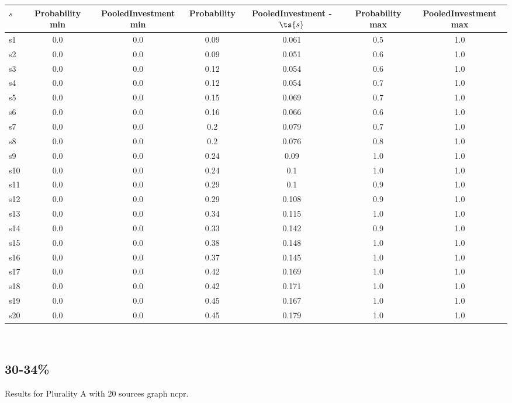 \documentclass{article}
\begin{document}
\noindent\begin{tabular}{|l|c|c|c|c|c|c|}
\hline
$s$& Probability min & PooledInvestment min & Probability & PooledInvestment - $\ts{s}$ & Probability max & PooledInvestment max\\
\hline
s1 &0.0 & 0.0 & 0.09 & 0.061 & 0.5 & 1.0\\
\hline
s2 &0.0 & 0.0 & 0.09 & 0.051 & 0.6 & 1.0\\
\hline
s3 &0.0 & 0.0 & 0.12 & 0.054 & 0.6 & 1.0\\
\hline
s4 &0.0 & 0.0 & 0.12 & 0.054 & 0.7 & 1.0\\
\hline
s5 &0.0 & 0.0 & 0.15 & 0.069 & 0.7 & 1.0\\
\hline
s6 &0.0 & 0.0 & 0.16 & 0.066 & 0.6 & 1.0\\
\hline
s7 &0.0 & 0.0 & 0.2 & 0.079 & 0.7 & 1.0\\
\hline
s8 &0.0 & 0.0 & 0.2 & 0.076 & 0.8 & 1.0\\
\hline
s9 &0.0 & 0.0 & 0.24 & 0.09 & 1.0 & 1.0\\
\hline
s10 &0.0 & 0.0 & 0.24 & 0.1 & 1.0 & 1.0\\
\hline
s11 &0.0 & 0.0 & 0.29 & 0.1 & 0.9 & 1.0\\
\hline
s12 &0.0 & 0.0 & 0.29 & 0.108 & 0.9 & 1.0\\
\hline
s13 &0.0 & 0.0 & 0.34 & 0.115 & 1.0 & 1.0\\
\hline
s14 &0.0 & 0.0 & 0.33 & 0.142 & 0.9 & 1.0\\
\hline
s15 &0.0 & 0.0 & 0.38 & 0.148 & 1.0 & 1.0\\
\hline
s16 &0.0 & 0.0 & 0.37 & 0.145 & 1.0 & 1.0\\
\hline
s17 &0.0 & 0.0 & 0.42 & 0.169 & 1.0 & 1.0\\
\hline
s18 &0.0 & 0.0 & 0.42 & 0.171 & 1.0 & 1.0\\
\hline
s19 &0.0 & 0.0 & 0.45 & 0.167 & 1.0 & 1.0\\
\hline
s20 &0.0 & 0.0 & 0.45 & 0.179 & 1.0 & 1.0\\
\hline
\end{tabular}\\

\newpage

\subsection{30-34\%}

\noindent Results for Plurality A with 20 sources graph ncpr.
\end{document}
